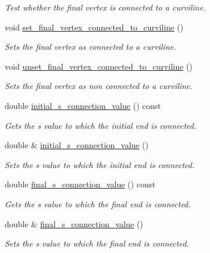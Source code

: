 \begin{DoxyCompactItemize}
\begin{DoxyCompactList}\small\item\em Test whether the final vertex is connected to a curviline. \end{DoxyCompactList}\item 
void \hyperlink{classoomph_1_1TriangleMeshCurveSection_af14d50cd734c6dc02c7fa0314dfadf68}{set\+\_\+final\+\_\+vertex\+\_\+connected\+\_\+to\+\_\+curviline} ()
\begin{DoxyCompactList}\small\item\em Sets the final vertex as connected to a curviline. \end{DoxyCompactList}\item 
void \hyperlink{classoomph_1_1TriangleMeshCurveSection_a169b20e7458f2ca0a7d64f35e475cecf}{unset\+\_\+final\+\_\+vertex\+\_\+connected\+\_\+to\+\_\+curviline} ()
\begin{DoxyCompactList}\small\item\em Sets the final vertex as non connected to a curviline. \end{DoxyCompactList}\item 
double \hyperlink{classoomph_1_1TriangleMeshCurveSection_adca140a1a261a98649d1af4a5d3e6cb8}{initial\+\_\+s\+\_\+connection\+\_\+value} () const
\begin{DoxyCompactList}\small\item\em Gets the s value to which the initial end is connected. \end{DoxyCompactList}\item 
double \& \hyperlink{classoomph_1_1TriangleMeshCurveSection_a80b972314a676c61e4fe5ed7fed005c8}{initial\+\_\+s\+\_\+connection\+\_\+value} ()
\begin{DoxyCompactList}\small\item\em Sets the s value to which the initial end is connected. \end{DoxyCompactList}\item 
double \hyperlink{classoomph_1_1TriangleMeshCurveSection_a221faf0fec4d8b67dede9a90ce15fc41}{final\+\_\+s\+\_\+connection\+\_\+value} () const
\begin{DoxyCompactList}\small\item\em Gets the s value to which the final end is connected. \end{DoxyCompactList}\item 
double \& \hyperlink{classoomph_1_1TriangleMeshCurveSection_aab6d3e6a3ce99d3ea8da762b75df3c6c}{final\+\_\+s\+\_\+connection\+\_\+value} ()
\begin{DoxyCompactList}\small\item\em Sets the s value to which the final end is connected. \end{DoxyCompactList}\item 

\end{DoxyCompactItemize}
